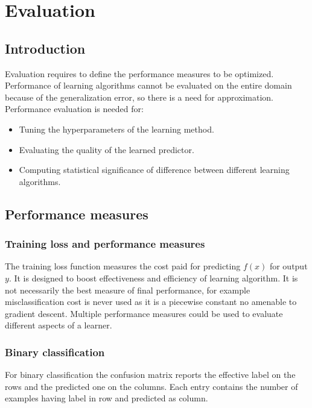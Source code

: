 \chapter{Evaluation}

\section{Introduction}
Evaluation requires to define the performance measures to be optimized.
Performance of learning algorithms cannot be evaluated on the entire domain because of the generalization error, so there is a need for approximation.
Performance evaluation is needed for:

\begin{multicols}{2}
	\begin{itemize}
		\item Tuning the hyperparameters of the learning method.
		\item Evaluating the quality of the learned predictor.
		\item Computing statistical significance of difference between different learning algorithms.
	\end{itemize}
\end{multicols}

\section{Performance measures}

	\subsection{Training loss and performance measures}
	The training loss function measures the cost paid for predicting $f(x)$ for output $y$.
	It is designed to boost effectiveness and efficiency of learning algorithm.
	It is not necessarily the best measure of final performance, for example misclassification cost is never used as it is a piecewise constant no amenable to gradient descent.
	Multiple performance measures could be used to evaluate different aspects of a learner.

	\subsection{Binary classification}
	For binary classification the confusion matrix reports the effective label on the rows and the predicted one on the columns.
	Each entry contains the number of examples having label in row and predicted as column.

